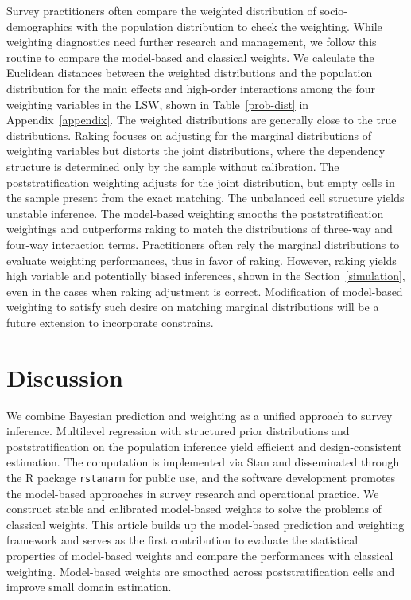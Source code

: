 \documentclass[11pt]{article}
\numberwithin{figure}{section}
\numberwithin{table}{section}
\numberwithin{equation}{section}
\begin{document}
Survey practitioners often compare the weighted distribution of
socio-demographics with the population distribution to check the weighting.
While weighting diagnostics need further research and management, we follow
this routine to compare the model-based and classical weights. We calculate the
Euclidean distances between the weighted distributions and the population
distribution for the main effects and high-order interactions among the four
weighting variables in the LSW, shown in Table~\ref{prob-dist} in
Appendix~\ref{appendix}. The weighted distributions are generally close to the
true distributions. Raking focuses on adjusting for the marginal distributions
of weighting variables but distorts the joint distributions, where the
dependency structure is determined only by the sample without calibration. The
poststratification weighting adjusts for the joint distribution, but empty
cells in the sample present from the exact matching. The unbalanced cell
structure yields unstable inference. The model-based weighting smooths the
poststratification weightings and outperforms raking to match the distributions
of three-way and four-way interaction terms. Practitioners often rely the
marginal distributions to evaluate weighting performances, thus in favor of
raking. However, raking yields high variable and potentially biased inferences,
shown in the Section~\ref{simulation}, even in the cases when raking adjustment
is correct.  Modification of model-based weighting to satisfy such desire on
matching marginal distributions will be a future extension to incorporate
constrains.

\section{Discussion} \label{discussion}

We combine Bayesian prediction and weighting as a unified approach to survey
inference. Multilevel regression with structured prior distributions and
poststratification on the population inference yield efficient and
design-consistent estimation. The computation is implemented via Stan and
disseminated through the R package {\tt rstanarm} for public use, and the
software development promotes the model-based approaches in survey research and
operational practice. We construct stable and calibrated model-based weights to
solve the problems of classical weights. This article builds up the model-based
prediction and weighting framework and serves as the first contribution to
evaluate the statistical properties of model-based weights and compare the
performances with classical weighting. Model-based weights are smoothed across
poststratification cells and improve small domain estimation. 
\end{document}
